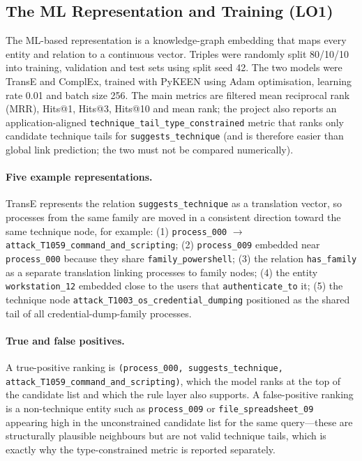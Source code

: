 \documentclass{article}
\begin{document}
\subsection{The ML Representation and Training (LO1)}
\label{sec:ml-training}
The ML-based representation is a knowledge-graph embedding that maps every
entity and relation to a continuous vector. Triples were randomly split
80/10/10 into training, validation and test sets using split seed 42. The two
models were TransE and ComplEx, trained with PyKEEN using Adam optimisation,
learning rate 0.01 and batch size 256. The main metrics are filtered mean
reciprocal rank (MRR), Hits@1, Hits@3, Hits@10 and mean rank; the project also
reports an application-aligned \texttt{technique\_tail\_type\_constrained}
metric that ranks only candidate technique tails for
\texttt{suggests\_technique} (and is therefore easier than global link
prediction; the two must not be compared numerically).

\paragraph{Five example representations.} TransE represents the relation
\texttt{suggests\_technique} as a translation vector, so processes from the
same family are moved in a consistent direction toward the same technique
node, for example: (1) \texttt{process\_000} $\to$
\texttt{attack\_T1059\_command\_and\_scripting}; (2) \texttt{process\_009}
embedded near \texttt{process\_000} because they share
\texttt{family\_powershell}; (3) the relation \texttt{has\_family} as a
separate translation linking processes to family nodes; (4) the entity
\texttt{workstation\_12} embedded close to the users that
\texttt{authenticate\_to} it; (5) the technique node
\texttt{attack\_T1003\_os\_credential\_dumping} positioned as the shared tail
of all credential-dump-family processes.

\paragraph{True and false positives.} A true-positive ranking is
\texttt{(process\_000, suggests\_technique,
attack\_T1059\_command\_and\_scripting)}, which the model ranks at the top of
the candidate list and which the rule layer also supports. A false-positive
ranking is a non-technique entity such as \texttt{process\_009} or
\texttt{file\_spreadsheet\_09} appearing high in the unconstrained candidate
list for the same query---these are structurally plausible neighbours but are
not valid technique tails, which is exactly why the type-constrained metric is
reported separately.
\end{document}
